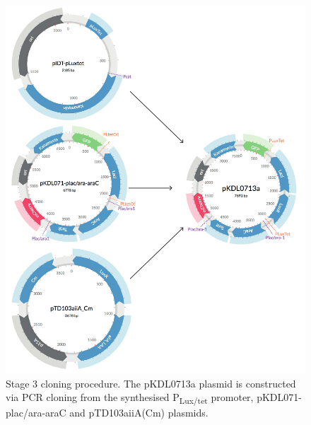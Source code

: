 \begin{figure}[htbp]
	\begin{center}
		\includegraphics[scale=0.7]{../../chapters/chapterDesignSwitches/images/stage3_cloning.pdf}
		\caption[Stage 3 cloning procedure.]{\label{fig:stage3}Stage 3 cloning procedure. The pKDL0713a plasmid is constructed via PCR cloning from the synthesised P\textsubscript{Lux/tet} promoter, pKDL071-plac/ara-araC and pTD103aiiA(Cm) plasmids.}
	\end{center}
\end{figure}
\clearpage



